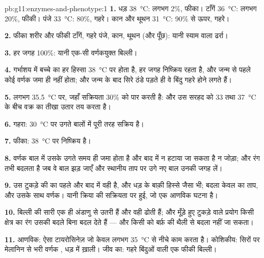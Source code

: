 \begin{solution}{pb:g11:enzymes-and-phenotype:1}
\textbf{1.} धड़ \qty{38}{\celsius}: लगभग 2\%, फीका। टाँगें
\qty{36}{\celsius}: लगभग 20\%, फीकी। पंजे \qty{33}{\celsius}: 80\%,
गहरे। कान और थूथन \qty{31}{\celsius}: 90\% से ऊपर, गहरे।

\textbf{2.} फीका शरीर और फीकी टाँगें, गहरे पंजे, कान, थूथन (और पूँछ):
यानी स्याम वाला ढर्रा।

\textbf{3.} हर जगह 100\%: यानी एक-सी वर्णकयुक्त बिल्ली।

\textbf{4.} गर्भाशय में बच्चे का हर हिस्सा \qty{38}{\celsius} पर होता है,
 हर जगह निष्क्रिय रहता है, और जन्म से पहले कोई वर्णक जमा ही नहीं
होता; और जन्म के बाद सिरे ठंडे पड़ते ही वे बिंदु गहरे होने लगते हैं।

\textbf{5.} लगभग \qty{35.5}{\celsius} पर, जहाँ सक्रियता 30\% को पार करती
है: और उस सरहद को 33 तथा \qty{37}{\celsius} के बीच वक्र का तीखा उतार तय
करता है।

\textbf{6.} गहरा: \qty{30}{\celsius} पर उगते बालों में  पूरी तरह
सक्रिय है।

\textbf{7.} फीका: \qty{38}{\celsius} पर  निष्क्रिय है।

\textbf{8.} वर्णक बाल में उसके उगते समय ही जमा होता है और बाद में न हटाया
जा सकता है न जोड़ा; और रंग तभी बदलता है जब वे बाल झड़ जाएँ और स्थानीय ताप
पर उगे नए बाल उनकी जगह लें।

\textbf{9.} उस टुकड़े की  का  पहले और बाद में वही है, और
धड़ के बाक़ी हिस्से जैसा भी; बदला केवल  का ताप, और उसके साथ वर्णक।
यानी क्रिया  की सक्रियता पर हुई, जो एक आणविक घटना है।

\textbf{10.} बिल्ली की सारी  एक ही अंडाणु से उतरी हैं और वही
 ढोती हैं; और मूँड़े हुए टुकड़े वाले प्रयोग किसी क्षेत्र का रंग उसकी
 बदले बिना बदल देते हैं --- और किसी  को बर्फ़ की थैली से
बदला नहीं जा सकता।

\textbf{11.} आणविक: ऐसा टायरोसिनेज़ जो केवल लगभग \qty{35}{\celsius} से
नीचे काम करता है। कोशिकीय: सिरों पर मेलानिन से भरी वर्णक , धड़ में
ख़ाली। जीव का: गहरे बिंदुओं वाली एक फीकी बिल्ली।


\end{solution}
